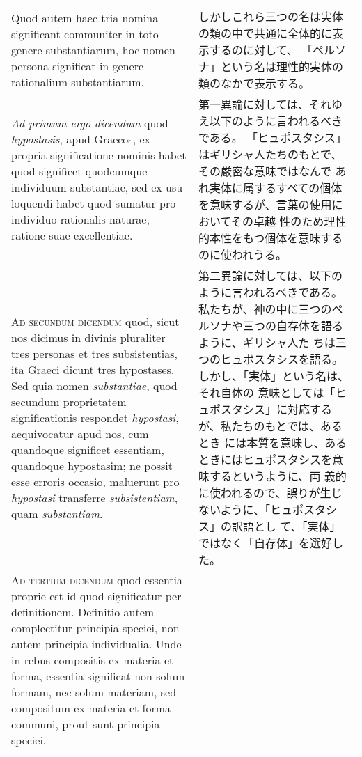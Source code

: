 \documentclass[10pt]{jsarticle} %
\begin{document}
\begin{longtable}{p{21em}p{21em}}
\\



Quod autem haec tria nomina significant communiter in toto
genere substantiarum, hoc nomen persona significat in genere rationalium
substantiarum.

&

しかしこれら三つの名は実体の類の中で共通に全体的に表示するのに対して、
 「ペルソナ」という名は理性的実体の類のなかで表示する。


\\


{\itshape Ad primum ergo dicendum} quod {\itshape hypostasis}, apud Graecos, ex propria
significatione nominis habet quod significet quodcumque individuum
substantiae, sed ex usu loquendi habet quod sumatur pro individuo
rationalis naturae, ratione suae excellentiae.

&

第一異論に対しては、それゆえ以下のように言われるべきである。
「ヒュポスタシス」はギリシャ人たちのもとで、その厳密な意味ではなんで
 あれ実体に属するすべての個体を意味するが、言葉の使用においてその卓越
 性のため理性的本性をもつ個体を意味するのに使われうる。


\\



{\scshape Ad secundum dicendum} quod, sicut nos dicimus in divinis pluraliter tres
personas et tres subsistentias, ita Graeci dicunt tres hypostases. Sed
quia nomen {\itshape substantiae}, quod secundum proprietatem significationis
respondet {\itshape hypostasi}, aequivocatur apud nos, cum quandoque significet
essentiam, quandoque hypostasim; ne possit esse erroris occasio,
maluerunt pro {\itshape hypostasi} transferre {\itshape subsistentiam}, quam {\itshape substantiam}.

&

第二異論に対しては、以下のように言われるべきである。
私たちが、神の中に三つのペルソナや三つの自存体を語るように、ギリシャ人た
 ちは三つのヒュポスタシスを語る。しかし、「実体」という名は、それ自体の
 意味としては「ヒュポスタシス」に対応するが、私たちのもとでは、あるとき
 には本質を意味し、あるときにはヒュポスタシスを意味するというように、両
 義的に使われるので、誤りが生じないように、「ヒュポスタシス」の訳語とし
 て、「実体」ではなく「自存体」を選好した。


\\



{\scshape Ad tertium dicendum} quod essentia proprie est id quod significatur per
definitionem. Definitio autem complectitur principia speciei, non autem
principia individualia. Unde in rebus compositis ex materia et forma,
essentia significat non solum formam, nec solum materiam, sed compositum
ex materia et forma communi, prout sunt principia speciei. 



\end{longtable}
\end{document}
